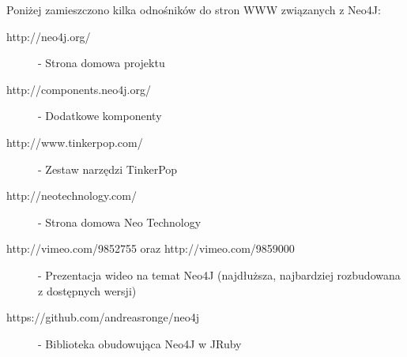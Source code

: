 Poniżej zamieszczono kilka odnośników do stron WWW związanych z Neo4J:

\begin{description}
 \item [http://neo4j.org/] - Strona domowa projektu
 \item [http://components.neo4j.org/] - Dodatkowe komponenty
 \item [http://www.tinkerpop.com/] - Zestaw narzędzi TinkerPop
 \item [http://neotechnology.com/] - Strona domowa Neo Technology 
 \item [http://vimeo.com/9852755 oraz http://vimeo.com/9859000] - Prezentacja wideo na temat Neo4J (najdłuższa, najbardziej rozbudowana z dostępnych wersji)
 \item [https://github.com/andreasronge/neo4j] - Biblioteka obudowująca Neo4J w JRuby
\end{description}
